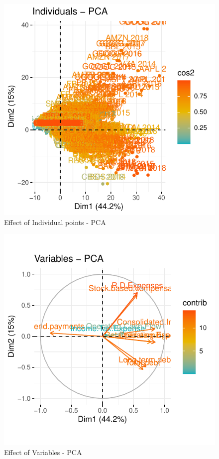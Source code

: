 \documentclass[11pt,]{article}
\begin{document}
\begin{figure}

{\centering \includegraphics{stock_analysis_files/figure-latex/PCAind-1} 

}

\caption{Effect of Individual points - PCA}\label{fig:PCAind}
\end{figure}
\begin{figure}

{\centering \includegraphics{stock_analysis_files/figure-latex/PCAvar-1} 

}

\caption{Effect of Variables - PCA}\label{fig:PCAvar}
\end{figure}
\end{document}
